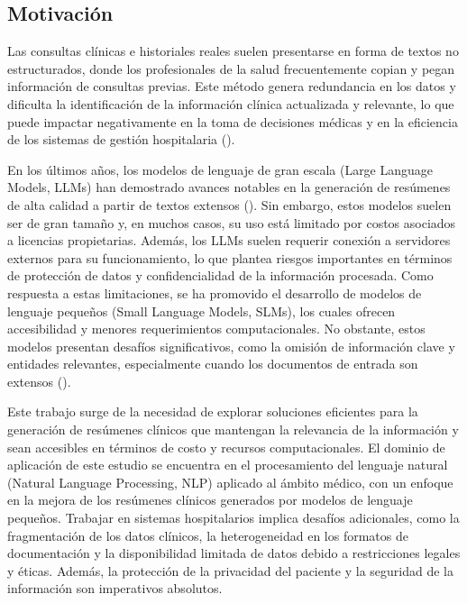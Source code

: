 \documentclass[../main.tex]{subfiles}
\begin{document}
\subsection{Motivación}
Las consultas clínicas e historiales reales suelen presentarse en forma de textos no estructurados, donde los profesionales de la
salud frecuentemente copian y pegan información de consultas previas. Este método genera redundancia en los datos y dificulta
la identificación de la información clínica actualizada y relevante, lo que puede impactar negativamente en la toma de decisiones
médicas y en la eficiencia de los sistemas de gestión hospitalaria (\cite{searle2021estimating}).

En los últimos años, los modelos de lenguaje de gran escala (Large Language Models, LLMs) han demostrado avances notables
en la generación de resúmenes de alta calidad a partir de textos extensos (\cite{zhang2025comprehensivesurveyprocessorientedautomatic}). Sin embargo, estos modelos suelen ser de gran
tamaño y, en muchos casos, su uso está limitado por costos asociados a licencias propietarias. Además, los LLMs suelen requerir conexión a servidores externos para su funcionamiento, lo que plantea riesgos importantes en términos de protección de datos y confidencialidad de la información procesada. Como respuesta a estas limitaciones,
se ha promovido el desarrollo de modelos de lenguaje pequeños (Small Language Models, SLMs), los cuales ofrecen accesibilidad
y menores requerimientos computacionales. No obstante, estos modelos presentan desafíos significativos, como la omisión de
información clave y entidades relevantes, especialmente cuando los documentos de entrada son extensos (\cite{zhang2024optimizingautomaticsummarizationlong,grail2021globalizing}).

Este trabajo surge de la necesidad de explorar soluciones eficientes para la generación de resúmenes clínicos que mantengan la relevancia de la información y sean accesibles en términos de costo y recursos computacionales. El dominio de aplicación de este estudio se encuentra en el procesamiento del lenguaje natural (Natural Language Processing, NLP) aplicado al ámbito médico, con un enfoque en la mejora de los resúmenes clínicos generados por modelos de lenguaje pequeños. Trabajar en sistemas hospitalarios implica desafíos adicionales, como la fragmentación de los datos clínicos, la heterogeneidad en los formatos de documentación y la disponibilidad limitada de datos debido a restricciones legales y éticas. Además, la protección de la privacidad del paciente y la seguridad de la información son imperativos absolutos.
\end{document}
